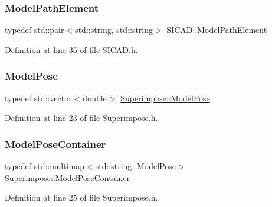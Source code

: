 \subsubsection{\texorpdfstring{Model\+Path\+Element}{ModelPathElement}}
{\footnotesize\ttfamily typedef std\+::pair$<$std\+::string, std\+::string$>$ \mbox{\hyperlink{classSICAD_a5148c8a96c82625706ce2e5b86b52dd7}{S\+I\+C\+A\+D\+::\+Model\+Path\+Element}}}



Definition at line 35 of file S\+I\+C\+A\+D.\+h.

\mbox{\label{classSuperimpose_a85d40a5caf19f486d1e0c15c0a025378}} 
\subsubsection{\texorpdfstring{Model\+Pose}{ModelPose}}
{\footnotesize\ttfamily typedef std\+::vector$<$double$>$ \mbox{\hyperlink{classSuperimpose_a85d40a5caf19f486d1e0c15c0a025378}{Superimpose\+::\+Model\+Pose}}\hspace{0.3cm}{\ttfamily [inherited]}}



Definition at line 23 of file Superimpose.\+h.

\mbox{\label{classSuperimpose_a178e3d4e2def6635bfcf9454dd4b5d22}} 
\subsubsection{\texorpdfstring{Model\+Pose\+Container}{ModelPoseContainer}}
{\footnotesize\ttfamily typedef std\+::multimap$<$std\+::string, \mbox{\hyperlink{classSuperimpose_a85d40a5caf19f486d1e0c15c0a025378}{Model\+Pose}}$>$ \mbox{\hyperlink{classSuperimpose_a178e3d4e2def6635bfcf9454dd4b5d22}{Superimpose\+::\+Model\+Pose\+Container}}\hspace{0.3cm}{\ttfamily [inherited]}}



Definition at line 25 of file Superimpose.\+h.

\mbox{\label{classSuperimpose_a1e02e0225687b42296dcfee4eadf8a55}} 
